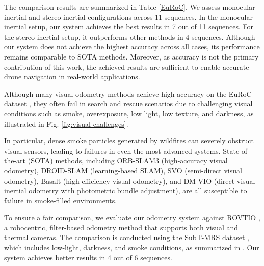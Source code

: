 The comparison results are summarized in Table \ref{EuRoC}. We assess monocular-inertial and stereo-inertial configurations across 11 sequences. In the monocular-inertial setup, our system achieves the best results in 7 out of 11 sequences. For the stereo-inertial setup, it outperforms other methods in 4 sequences. Although our system does not achieve the highest accuracy across all cases, its performance remains comparable to SOTA methods. Moreover, as accuracy is not the primary contribution of this work, the achieved results are sufficient to enable accurate drone navigation in real-world applications.









Although many visual odometry methods achieve high accuracy on the EuRoC dataset \cite{burri2016euroc}, they often fail in search and rescue scenarios due to challenging visual conditions such as smoke, overexposure, low light, low texture, and darkness, as illustrated in Fig. \ref{fig:visual challenges}.

In particular, dense smoke particles generated by wildfires can severely obstruct visual sensors, leading to failures in even the most advanced systems. State-of-the-art (SOTA) methods, including ORB-SLAM3 \cite{orbslam3} (high-accuracy visual odometry), DROID-SLAM \cite{teed2021droid} (learning-based SLAM), SVO \cite{forster2014svo} (semi-direct visual odometry), Basalt \cite{usenko2019visual} (high-efficiency visual odometry), and DM-VIO \cite{von2022dm} (direct visual-inertial odometry with photometric bundle adjustment), are all susceptible to failure in smoke-filled environments.

To ensure a fair comparison, we evaluate our odometry system against ROVTIO \cite{flemmen2021rovtio}, a robocentric, filter-based odometry method that supports both visual and thermal cameras. The comparison is conducted using the SubT-MRS dataset \cite{zhao2023subtmrs}, which includes low-light, darkness, and smoke conditions, as summarized in . Our system achieves better results in 4 out of 6 sequences.


